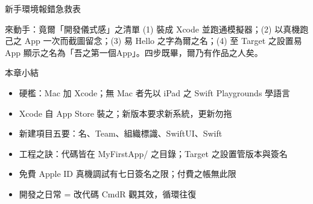 \begin{center}\small\color{gray}新手環境報錯急救表\end{center}

\begin{tcbpractice}{來動手：竟爾「開發儀式感」之清單}
(1) 裝成 Xcode 並跑通模擬器；(2) 以真機跑己之 App 一次而截圖留念；(3) 易 Hello 之字為爾之名；(4) 至 Target 之設置易 App 顯示之名為「吾之第一個App」。四步既畢，爾乃有作品之人矣。

\end{tcbpractice}

\begin{tcbsummary}{本章小結}
\begin{itemize}
  \item 硬檻：Mac 加 Xcode；無 Mac 者先以 iPad 之 Swift Playgrounds 學語言
  \item Xcode 自 App Store 裝之；新版本要求新系統，更新勿拖
  \item 新建項目五要：名、Team、組織標識、SwiftUI、Swift
  \item 工程之訣：代碼皆在 MyFirstApp/ 之目錄；Target 之設置管版本與簽名
  \item 免費 Apple ID 真機調試有七日簽名之限；付費之帳無此限
  \item 開發之日常 = 改代碼 CmdR 觀其效，循環往復
\end{itemize}

\end{tcbsummary}
